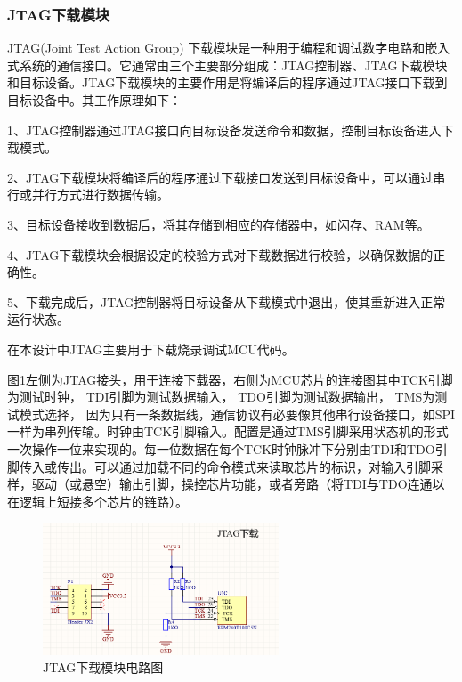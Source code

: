     \subsubsection{JTAG下载模块}
    JTAG(Joint Test Action Group) 下载模块是一种用于编程和调试数字电路和嵌入式系统的通信接口。它通常由三个主要部分组成：JTAG控制器、JTAG下载模块和目标设备。JTAG下载模块的主要作用是将编译后的程序通过JTAG接口下载到目标设备中。其工作原理如下：
    
1、JTAG控制器通过JTAG接口向目标设备发送命令和数据，控制目标设备进入下载模式。

2、JTAG下载模块将编译后的程序通过下载接口发送到目标设备中，可以通过串行或并行方式进行数据传输。

3、目标设备接收到数据后，将其存储到相应的存储器中，如闪存、RAM等。

4、JTAG下载模块会根据设定的校验方式对下载数据进行校验，以确保数据的正确性。

5、下载完成后，JTAG控制器将目标设备从下载模式中退出，使其重新进入正常运行状态。

在本设计中JTAG主要用于下载烧录调试MCU代码。

    图\ref{JTAG下载模块电路图}左侧为JTAG接头，用于连接下载器，右侧为MCU芯片的连接图其中TCK引脚为测试时钟，
    TDI引脚为测试数据输入，
TDO引脚为测试数据输出，
TMS为测试模式选择，
因为只有一条数据线，通信协议有必要像其他串行设备接口，如SPI一样为串列传输。时钟由TCK引脚输入。配置是通过TMS引脚采用状态机的形式一次操作一位来实现的。每一位数据在每个TCK时钟脉冲下分别由TDI和TDO引脚传入或传出。可以通过加载不同的命令模式来读取芯片的标识，对输入引脚采样，驱动（或悬空）输出引脚，操控芯片功能，或者旁路（将TDI与TDO连通以在逻辑上短接多个芯片的链路）。
    \begin{figure}[ht]
        \centering
        \includegraphics[width=7cm]{figure/JTAG download circuit.png}
        \caption{JTAG下载模块电路图}
        \label{JTAG下载模块电路图}
    \end{figure}
    
